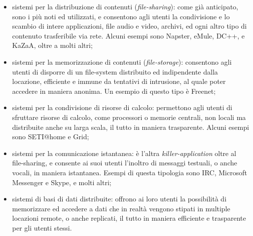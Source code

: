 \begin{itemize}
\item sistemi per la distribuzione di contenuti (\textit{file-sharing}): come già anticipato, sono i più noti ed utilizzati, e consentono agli utenti la condivisione e lo scambio di 	intere applicazioni, file audio e video, archivi, ed ogni altro tipo di contenuto trasferibile via rete. Alcuni esempi sono Napster, eMule, DC++, e KaZaA, oltre a molti altri;
\item sistemi per la memorizzazione di contenuti (\textit{file-storage}): consentono agli utenti di disporre di un file-system distribuito ed indipendente dalla locazione, efficiente e immune da tentativi di intrusione, al quale poter accedere in maniera anonima. Un esempio di questo tipo è Freenet;
\item sistemi per la condivisione di risorse di calcolo: permettono agli utenti di sfruttare risorse di calcolo, come processori o memorie centrali, non locali ma distribuite anche su larga scala, il tutto in maniera trasparente. Alcuni esempi sono SETI@home e Grid;
\item sistemi per la comunicazione istantanea: è l’altra \textit{killer-application} oltre al file-sharing, e consente ai suoi utenti l’inoltro di messaggi testuali, o anche vocali, in maniera istantanea. Esempi di questa tipologia sono IRC, Microsoft Messenger e Skype, e molti altri;
\item sistemi di basi di dati distribuite: offrono ai loro utenti la possibilità di memorizzare ed accedere a dati che in realtà vengono stipati in multiple locazioni remote, o anche replicati, il tutto in maniera efficiente e trasparente per gli utenti stessi.
\end{itemize}
